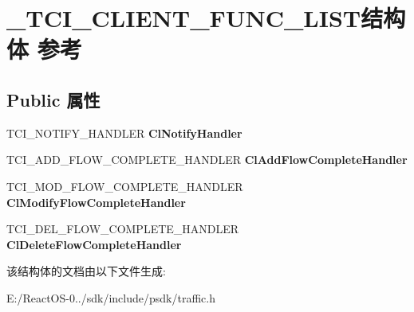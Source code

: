 \hypertarget{struct___t_c_i___c_l_i_e_n_t___f_u_n_c___l_i_s_t}{}\section{\+\_\+\+T\+C\+I\+\_\+\+C\+L\+I\+E\+N\+T\+\_\+\+F\+U\+N\+C\+\_\+\+L\+I\+S\+T结构体 参考}
\label{struct___t_c_i___c_l_i_e_n_t___f_u_n_c___l_i_s_t}
\subsection*{Public 属性}
\begin{DoxyCompactItemize}
\item 
\mbox{\label{struct___t_c_i___c_l_i_e_n_t___f_u_n_c___l_i_s_t_a379894b322bd09e2dd7353eab866e533}} 
T\+C\+I\+\_\+\+N\+O\+T\+I\+F\+Y\+\_\+\+H\+A\+N\+D\+L\+ER {\bfseries Cl\+Notify\+Handler}
\item 
\mbox{\label{struct___t_c_i___c_l_i_e_n_t___f_u_n_c___l_i_s_t_a5d005d2d7f9ed8dbef7b00539a84b4d1}} 
T\+C\+I\+\_\+\+A\+D\+D\+\_\+\+F\+L\+O\+W\+\_\+\+C\+O\+M\+P\+L\+E\+T\+E\+\_\+\+H\+A\+N\+D\+L\+ER {\bfseries Cl\+Add\+Flow\+Complete\+Handler}
\item 
\mbox{\label{struct___t_c_i___c_l_i_e_n_t___f_u_n_c___l_i_s_t_acadc9bb31791d9c67a6e8932019d6fcd}} 
T\+C\+I\+\_\+\+M\+O\+D\+\_\+\+F\+L\+O\+W\+\_\+\+C\+O\+M\+P\+L\+E\+T\+E\+\_\+\+H\+A\+N\+D\+L\+ER {\bfseries Cl\+Modify\+Flow\+Complete\+Handler}
\item 
\mbox{\label{struct___t_c_i___c_l_i_e_n_t___f_u_n_c___l_i_s_t_a238de4b733e9152f3f91e62378cf6ab9}} 
T\+C\+I\+\_\+\+D\+E\+L\+\_\+\+F\+L\+O\+W\+\_\+\+C\+O\+M\+P\+L\+E\+T\+E\+\_\+\+H\+A\+N\+D\+L\+ER {\bfseries Cl\+Delete\+Flow\+Complete\+Handler}
\end{DoxyCompactItemize}


该结构体的文档由以下文件生成\+:\begin{DoxyCompactItemize}
\item 
E\+:/\+React\+O\+S-\/0../sdk/include/psdk/traffic.\+h\end{DoxyCompactItemize}

